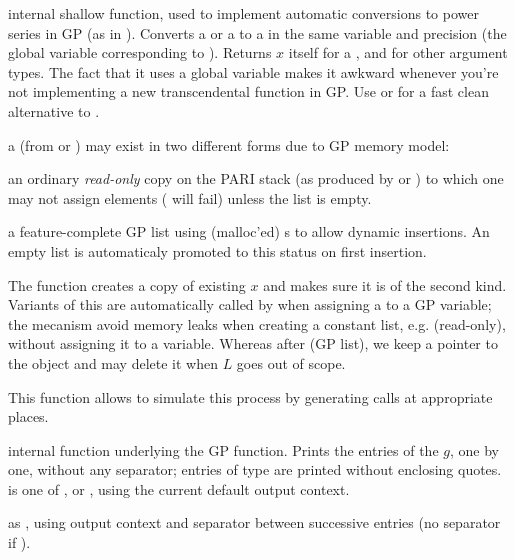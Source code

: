 
 internal shallow function, used to implement
automatic conversions to power series in GP (as in ).
Converts a  or a  to a  in the same variable and
precision  (the global variable corresponding to
). Returns $x$ itself for a , and 
for other argument types. The fact that it uses a global variable makes it
awkward whenever you're not implementing a new transcendental function in GP.
Use  or  for a fast clean alternative to
.

 a  (from  or ) may
exist in two different forms due to GP memory model:

\item an ordinary \emph{read-only} copy on the PARI stack (as produced by
 or ) to which one may not assign elements
( will fail) unless the list is empty.

\item a feature-complete GP list using (malloc'ed) s to
allow dynamic insertions. An empty list is automaticaly promoted to this
status on first insertion.

The  function creates a copy of existing  $x$ and
makes sure it is of the second kind. Variants of this are automatically
called by  when assigning a  to a GP variable; the
mecanism avoid memory leaks when creating a constant list, e.g.
 (read-only), without assigning it to a variable. Whereas
after  (GP list), we keep a pointer to the object and
may delete it when $L$ goes out of scope.

This  function allows  to simulate this process by
generating  calls at appropriate places.


 internal function underlying the
 GP function. Prints the entries of the  $g$, one by one,
without any separator; entries of type  are printed without enclosing
quotes. \fl is one of ,  or , using the
current default output context.

 as
, using output context  and separator  between
successive entries (no separator if ).


